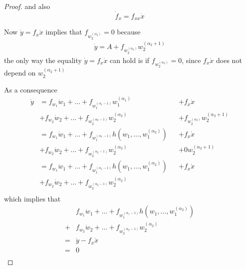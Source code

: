\documentclass[12pt]{article}
\begin{document}
\begin{proof}
and also \label{TODO19}
\begin{equation} \label{dotFEqFxxDotx}
  \dot{f}_x = f_{xx}\dot{x}
\end{equation}

Now $\dot{y} = f_x \dot{x}$ implies that $f_{w_2^{(\alpha_2)}} = 0$ because
\begin{align}
  \dot{y} = A + f_{w_2^{(\alpha_2)}}w_2^{(\alpha_2 + 1)}
\end{align}
the only way the equality $\dot{y} = f_x \dot{x}$ can hold is if $f_{w_2^{(\alpha_2)}} = 0$, since $f_x \dot{x}$ does not depend on $w_2^{(\alpha_2 + 1)}$

As a consequence
\begin{equation}\begin{alignedat}{3}
  \dot{y}
  &= f_{w_1} \dot{w}_1 + \ldots + f_{w_1^{(\alpha_1 - 1 )}}w_1^{(\alpha_1)} &&+ f_{x}\dot{x} \\
  &+ f_{w_2} \dot{w}_2 + \ldots + f_{w_2^{(\alpha_2 - 1 )}}w_2^{(\alpha_2)} &&+ f_{w_2^{(\alpha_2)}}w_2^{(\alpha_2 + 1)} \\
  &= f_{w_1} \dot{w}_1 + \ldots + f_{w_1^{(\alpha_1 - 1 )}} h(w_1, \ldots, w_1^{(\alpha_2)}) &&+ f_{x}\dot{x} \\
  &+ f_{w_2} \dot{w}_2 + \ldots + f_{w_2^{(\alpha_2 - 1 )}}w_2^{(\alpha_2)} &&+ 0w_2^{(\alpha_2 + 1)} \\
  &= f_{w_1} \dot{w}_1 + \ldots + f_{w_1^{(\alpha_1 - 1 )}} h(w_1, \ldots, w_1^{(\alpha_2)}) &&+ f_{x}\dot{x} \\
  &+ f_{w_2} \dot{w}_2 + \ldots + f_{w_2^{(\alpha_2 - 1 )}}w_2^{(\alpha_2)} && \\
\end{alignedat}\end{equation}
which implies that 
\begin{equation}\begin{aligned} \label{fxdotyfdotx}
  &f_{w_1} \dot{w}_1 + \ldots + f_{w_1^{(\alpha_1 - 1 )}} h(w_1, \ldots, w_1^{(\alpha_2)}) \\
  + &f_{w_2} \dot{w}_2 + \ldots + f_{w_2^{(\alpha_2 - 1 )}}w_2^{(\alpha_2)} \\
  = &\dot{y} - f_{x}\dot{x} \\ 
  = &0 \\  
\end{aligned}\end{equation}


\end{proof}
\end{document}
